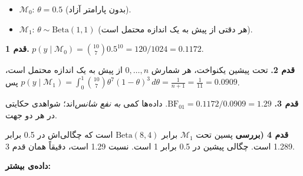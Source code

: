 \begin{itemize}
\tightlist
\item
  \(\mathcal{M}_0\): \(\theta = 0.5\) (بدون پارامتر آزاد).
\item
  \(\mathcal{M}_1\): \(\theta \sim \mathrm{Beta}(1, 1)\) (هر دقتی از پیش
  به یک اندازه محتمل است).
\end{itemize}

\textbf{قدم 1.}
\(p(y\mid\mathcal{M}_0) = \binom{10}{7} 0.5^{10} = 120/1024 = 0.1172\).

\textbf{قدم 2.} تحت پیشین یکنواخت، هر شمارش \(0, \dots, n\) از پیش به یک
اندازه محتمل است، پس
\(p(y\mid\mathcal{M}_1) = \int_0^1 \binom{10}{7}\theta^7(1-\theta)^3\, d\theta = \frac{1}{n+1} = \frac{1}{11} = 0.0909\).

\textbf{قدم 3.} \(\mathrm{BF}_{01} = 0.1172 / 0.0909 = 1.29\). داده‌ها
کمی \emph{به نفع شانس}‌اند؛ شواهدی حکایتی در هر دو جهت.

\textbf{قدم 4 (بررسی } پسین تحت \(\mathcal{M}_1\)
برابر \(\mathrm{Beta}(8, 4)\) است که چگالی‌اش در 0.5 برابر 1.289 است.
چگالی پیشین در 0.5 برابر 1 است. نسبت 1.29 است، دقیقاً همان قدم 3.

\textbf{داده‌ی بیشتر:}

